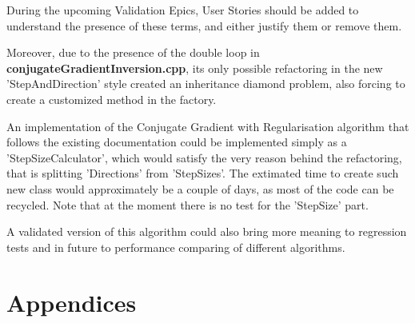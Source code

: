\documentclass[10pt,a4paper]{article}
\begin{document}
{During the upcoming Validation Epics, User Stories should be added to understand the presence of these terms, and either justify them or remove them.

Moreover, due to the presence of the double loop in \textbf{conjugateGradientInversion.cpp}, its only possible refactoring in the new 'StepAndDirection' style created an inheritance diamond problem, also forcing to create a customized method in the factory.

An implementation of the Conjugate Gradient with Regularisation algorithm that follows the existing documentation could be implemented simply as a 'StepSizeCalculator', which would satisfy the very reason behind the refactoring, that is splitting 'Directions' from 'StepSizes'. 
The extimated time to create such new class would approximately be a couple of days, as most of the code can be recycled.
Note that at the moment there is no test for the 'StepSize' part.

A validated version of this algorithm could also bring more meaning to regression tests and in future to performance comparing of different algorithms.


\appendix
\section{Appendices}
}
\end{document}
